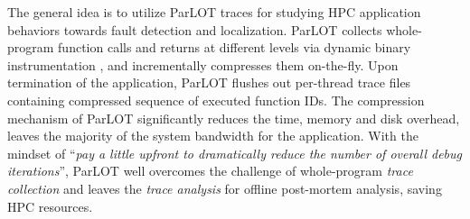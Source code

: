 The general idea is to utilize ParLOT \cite{ parlot} traces for studying HPC application behaviors towards fault detection and localization.
%
ParLOT collects whole-program function calls and returns at different levels via dynamic binary instrumentation \cite{pin}, and incrementally compresses them on-the-fly.
%
Upon termination of the application, ParLOT flushes out per-thread trace files containing compressed sequence of executed function IDs.
%
The compression mechanism of ParLOT significantly reduces the time, memory and disk overhead, leaves the majority of the system bandwidth for the application. 
%
With the mindset of ``\textit{pay a little upfront to dramatically reduce the number of overall debug iterations}'', ParLOT well overcomes the challenge of whole-program \textit{trace collection} and leaves the \textit{trace analysis} for offline post-mortem analysis, saving HPC resources.
%

